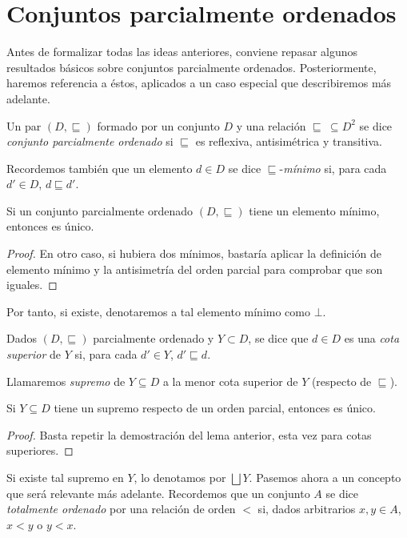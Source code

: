 \section{Conjuntos parcialmente ordenados}

Antes de formalizar todas las ideas anteriores, conviene repasar algunos resultados básicos sobre conjuntos parcialmente ordenados. Posteriormente, haremos referencia a éstos, aplicados a un caso especial que describiremos más adelante.

\begin{definition}
Un par $(D,  \sqsubseteq)$ formado por un conjunto $D$ y una relación $\sqsubseteq \ \subseteq D^2$ se dice \textit{conjunto parcialmente ordenado} si $\sqsubseteq$ es reflexiva, antisimétrica y transitiva. 
\end{definition}

Recordemos también que un elemento $d \in D$ se dice $\sqsubseteq$-\textit{mínimo} si, para cada $d' \in D$, $d \sqsubseteq d'$.

\begin{lema}
Si un conjunto parcialmente ordenado $(D, \sqsubseteq)$ tiene un elemento mínimo, entonces es único. 
\end{lema}
\begin{proof}
En otro caso, si hubiera dos mínimos, bastaría aplicar la definición de elemento mínimo y la antisimetría del orden parcial para comprobar que son iguales.
\end{proof}

Por tanto, si existe, denotaremos a tal elemento mínimo como $\bot$.

\begin{definition} 
Dados $(D, \sqsubseteq)$ parcialmente ordenado y $Y\subset D$, se dice que $d\in D$ es una \textit{cota superior} de $Y$ si, para cada $d' \in Y$, $d' \sqsubseteq d$.
\end{definition}

Llamaremos \textit{supremo} de $Y \subseteq D$ a la menor cota superior de $Y$ (respecto de $\sqsubseteq$).

\begin{lema}
Si $Y \subseteq D$ tiene un supremo respecto de un orden parcial, entonces es único.
\end{lema}
\begin{proof}
Basta repetir la demostración del lema anterior, esta vez para cotas superiores.
\end{proof}

Si existe tal supremo en $Y$, lo denotamos por $\bigsqcup Y$. Pasemos ahora a un concepto que será relevante más adelante. Recordemos que un conjunto $A$ se dice \textit{totalmente ordenado} por una relación de orden $<$ si, dados arbitrarios $x, y \in A$, $x < y$ o $y < x$.

